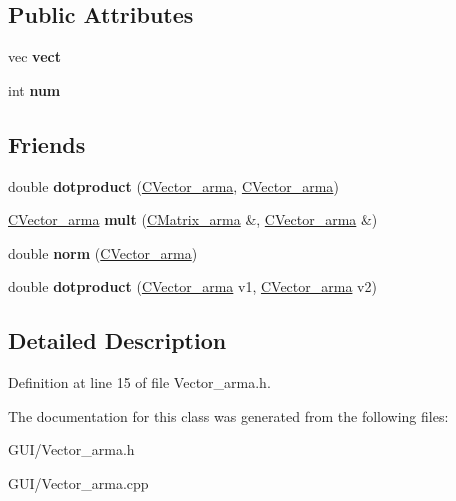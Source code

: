 \subsection*{Public Attributes}
\begin{DoxyCompactItemize}
\item 
\mbox{\label{class_c_vector__arma_af48a07b30f9a8dc33636ed0d3bed6d8f}} 
vec {\bfseries vect}
\item 
\mbox{\label{class_c_vector__arma_a5ccbfdc21bb2a74e6e6b7abe9c8bdd04}} 
int {\bfseries num}
\end{DoxyCompactItemize}
\subsection*{Friends}
\begin{DoxyCompactItemize}
\item 
\mbox{\label{class_c_vector__arma_a756643dd78bb111550a40be3dfef5067}} 
double {\bfseries dotproduct} (\hyperlink{class_c_vector__arma}{C\+Vector\+\_\+arma}, \hyperlink{class_c_vector__arma}{C\+Vector\+\_\+arma})
\item 
\mbox{\label{class_c_vector__arma_a305145ed021699fbc20fca4b4eeb256a}} 
\hyperlink{class_c_vector__arma}{C\+Vector\+\_\+arma} {\bfseries mult} (\hyperlink{class_c_matrix__arma}{C\+Matrix\+\_\+arma} \&, \hyperlink{class_c_vector__arma}{C\+Vector\+\_\+arma} \&)
\item 
\mbox{\label{class_c_vector__arma_a23152a56326ca6174fe6766c572c2960}} 
double {\bfseries norm} (\hyperlink{class_c_vector__arma}{C\+Vector\+\_\+arma})
\item 
\mbox{\label{class_c_vector__arma_acfad3400fa7055c0c0b0acebab7f2923}} 
double {\bfseries dotproduct} (\hyperlink{class_c_vector__arma}{C\+Vector\+\_\+arma} v1, \hyperlink{class_c_vector__arma}{C\+Vector\+\_\+arma} v2)
\end{DoxyCompactItemize}


\subsection{Detailed Description}


Definition at line 15 of file Vector\+\_\+arma.\+h.



The documentation for this class was generated from the following files\+:\begin{DoxyCompactItemize}
\item 
G\+U\+I/Vector\+\_\+arma.\+h\item 
G\+U\+I/Vector\+\_\+arma.\+cpp\end{DoxyCompactItemize}
